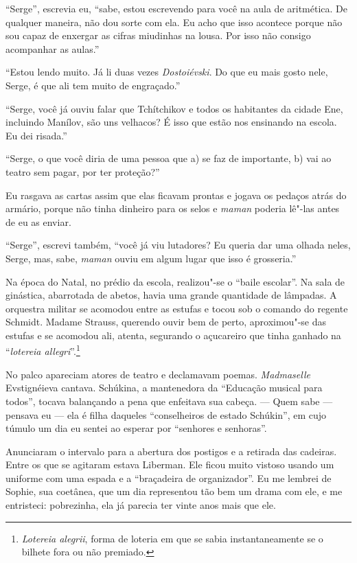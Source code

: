 ``Serge'', escrevia eu, ``sabe, estou escrevendo para você na aula de
aritmética. De qualquer maneira, não dou sorte com ela. Eu acho que isso
acontece porque não sou capaz de enxergar as cifras miudinhas na lousa.
Por isso não consigo acompanhar as aulas.''

``Estou lendo muito. Já li duas vezes \emph{Dostoiévski}. Do que eu mais
gosto nele, Serge, é que ali tem muito de engraçado.''

``Serge, você já ouviu falar que Tchítchikov e todos os habitantes da
cidade Ene, incluindo Manílov, são uns velhacos? É isso que estão nos
ensinando na escola. Eu dei risada.''

``Serge, o que você diria de uma pessoa que a) se faz de importante, b)
vai ao teatro sem pagar, por ter proteção?''

Eu rasgava as cartas assim que elas ficavam prontas e jogava os pedaços
atrás do armário, porque não tinha dinheiro para os selos e \emph{maman}
poderia lê"-las antes de eu as enviar.

``Serge'', escrevi também, ``você já viu lutadores? Eu queria dar uma
olhada neles, Serge, mas, sabe, \emph{maman} ouviu em algum lugar que
isso é grosseria.''

Na época do Natal, no prédio da escola, realizou"-se o ``baile escolar''.
Na sala de ginástica, abarrotada de abetos, havia uma grande quantidade
de lâmpadas. A orquestra militar se acomodou entre as estufas e tocou
sob o comando do regente Schmidt. Madame Strauss, querendo ouvir bem de
perto, aproximou"-se das estufas e se acomodou ali, atenta, segurando o
açucareiro que tinha ganhado na ``\emph{lotereia allegri}''.\footnote{\emph{Lotereia
  alegrii}, forma de loteria em que se sabia instantaneamente se o %
  bilhete fora ou não premiado.}

No palco apareciam atores de teatro e declamavam poemas.
\emph{Madmaselle} Evstignéieva cantava. Schúkina, a mantenedora da
``Educação musical para todos'', tocava balançando a pena que enfeitava
sua cabeça. --- Quem sabe --- pensava eu --- ela é filha daqueles
``conselheiros de estado Schúkin'', em cujo túmulo um dia eu sentei ao
esperar por ``senhores e senhoras''.

Anunciaram o intervalo para a abertura dos postigos e a retirada das
cadeiras. Entre os que se agitaram estava Liberman. Ele ficou muito
vistoso usando um uniforme com uma espada e a ``braçadeira de
organizador''. Eu me lembrei de Sophie, sua coetânea, que um dia
representou tão bem um drama com ele, e me entristeci: pobrezinha, ela
já parecia ter vinte anos mais que ele.

